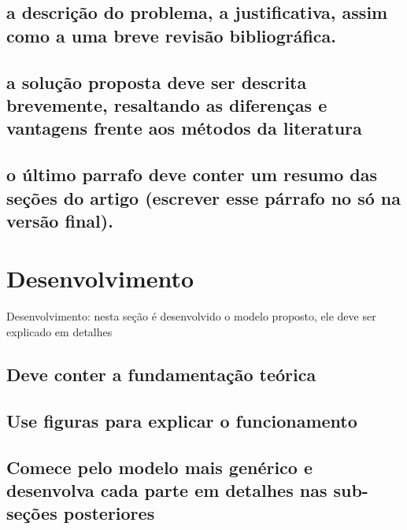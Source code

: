 \documentclass[12pt]{article}
\begin{document}
\subsection{a descrição do problema, a justificativa, assim como a uma breve revisão bibliográfica.}
\subsection{a solução proposta deve ser descrita brevemente, resaltando as diferenças e vantagens frente aos métodos da literatura}
\subsection{o último parrafo deve conter um resumo das seções do artigo (escrever esse párrafo no só na versão final).}

\section{Desenvolvimento}
Desenvolvimento: nesta seção é desenvolvido o modelo proposto, ele deve ser explicado em detalhes
\subsection{Deve conter a fundamentação teórica}
\subsection{Use figuras para explicar o funcionamento}
\subsection{Comece pelo modelo mais genérico e desenvolva cada parte em detalhes nas sub-seções posteriores}




\end{document}

